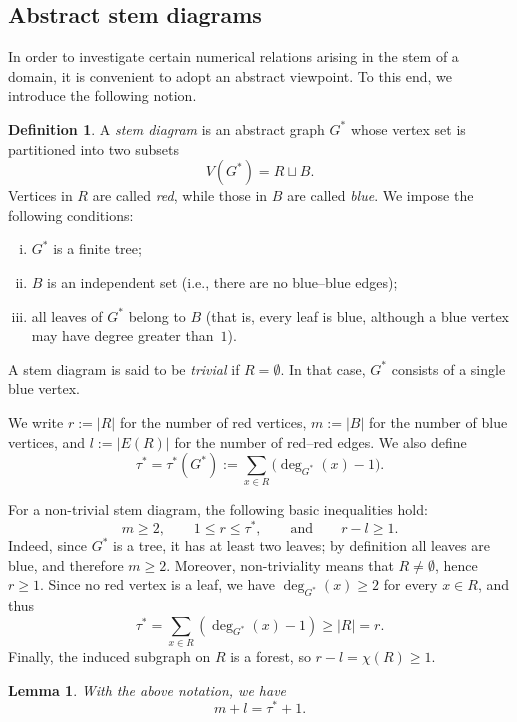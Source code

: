 \documentclass[a4paper, 11pt]{article}
\numberwithin{equation}{section}
\newtheorem{lemma}[theorem]{Lemma}
\theoremstyle{definition}
\newtheorem{definition}[theorem]{Definition}
\theoremstyle{remark}
\begin{document}
\subsection{Abstract stem diagrams} \label{sec.stemdiagrams} 

In order to investigate certain numerical relations arising in the stem of a domain, it is convenient to adopt an abstract viewpoint. 
To this end, we introduce the following notion.

\begin{definition}\label{def.stemdiagram}
A \emph{stem diagram} is an abstract graph $G^*$ whose vertex set is partitioned into two subsets
\[
V(G^*) = R \sqcup B.
\]
Vertices in $R$ are called \emph{red}, while those in $B$ are called \emph{blue}. We impose the following conditions:
\begin{enumerate}[(i)]
 \item $G^*$ is a finite tree;
 \item $B$ is an independent set (i.e., there are no blue--blue edges);
 \item all leaves of $G^*$ belong to $B$ (that is, every leaf is blue, although a blue vertex may have degree greater than~$1$).
\end{enumerate}
A stem diagram is said to be \emph{trivial} if $R = \emptyset$. In that case, $G^*$ consists of a single blue vertex.
\end{definition}
We write $r := |R|$ for the number of red vertices, $m := |B|$ for the number of blue vertices, and $l := |E(R)|$ for the number of red--red edges. We also define
\[
\tau^* = \tau^*(G^*) := \sum_{x \in R} \bigl(\deg_{G^*}(x) - 1\bigr).
\]

For a non-trivial stem diagram, the following basic inequalities hold:
\begin{equation}\label{basicstemequ}
  m\ge 2, \qquad 1\le r \le \tau^*, \qquad \text{and} \qquad r-l\ge 1.
\end{equation}
Indeed, since $G^*$ is a tree, it has at least two leaves; by definition all leaves
are blue, and therefore $m\ge 2$.
Moreover, non-triviality means that $R\neq \emptyset$, hence $r\ge 1$.
Since no red vertex is a leaf, we have $\deg_{G^*}(x)\ge 2$ for every $x\in R$, and thus
\[
  \tau^* =\sum_{x\in R}(\deg_{G^*}(x)-1)\ge |R|=r.
\]
Finally, the induced subgraph on $R$ is a forest, so $r-l=\chi(R)\ge 1$.
 

\medskip

\begin{lemma}\label{lem.graphcount}
With the above notation, we have
\[
 m+l=\tau^*+1.
\]
\end{lemma}
\end{document}
